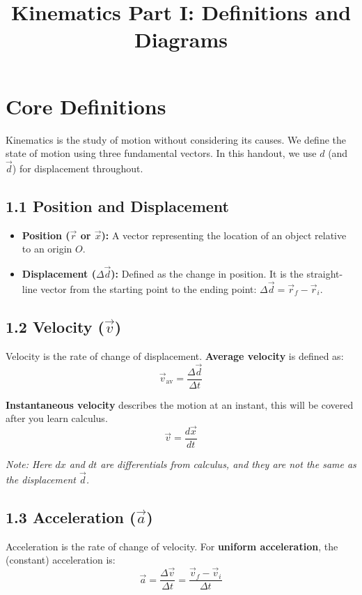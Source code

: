 \documentclass{article}
\begin{document}
\title{Kinematics Part I: Definitions and Diagrams}
\author{}
\date{}
\maketitle

\section{Core Definitions}

Kinematics is the study of motion without considering its causes. We define the state of motion using three fundamental vectors. In this handout, we use $d$ (and $\vec{d}$) for displacement throughout.

\subsection*{1.1 Position and Displacement}
\begin{itemize}
  \item \textbf{Position ($\vec{r}$ or $\vec{x}$):} A vector representing the location of an object relative to an origin $O$.
  \item \textbf{Displacement ($\Delta \vec{d}$):} Defined as the change in position. It is the straight-line vector from the starting point to the ending point: $\Delta \vec{d} = \vec{r}_f - \vec{r}_i$.
\end{itemize}

\subsection*{1.2 Velocity ($\vec{v}$)}
Velocity is the rate of change of displacement. \textbf{Average velocity} is defined as:
\begin{equation}
  \vec{v}_{\text{av}} = \frac{\Delta \vec{d}}{\Delta t}
  \label{eq:v_avg}
\end{equation}

\textbf{Instantaneous velocity} describes the motion at an instant, this will be covered after you learn calculus.
\begin{equation}
  \vec{v} = \frac{d\vec{x}}{dt}
  \label{eq:v_inst}
\end{equation}

\textit{Note: Here $dx$ and $dt$ are differentials from calculus, and they are not the same as the displacement $\vec{d}$.}

\subsection*{1.3 Acceleration ($\vec{a}$)}
Acceleration is the rate of change of velocity. For \textbf{uniform acceleration}, the (constant) acceleration is:
\begin{equation}
  \vec{a} = \frac{\Delta \vec{v}}{\Delta t} = \frac{\vec{v}_f - \vec{v}_i}{\Delta t}
  \label{eq:accel_def}
\end{equation}
\end{document}
